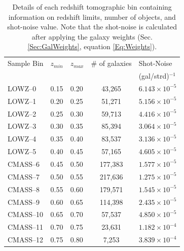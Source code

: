 \begin{table}
\centering
\caption[Tomographic redshift bins limits, number of galaxies, and shot-noise levels.]{Details of each redshift tomographic bin containing information on redshift limits, number of objects, and shot-noise value. Note that the shot-noise is calculated after applying the galaxy weights (Sec. \ref{Sec:GalWeights}, equation \eqref{Eq:Weights}).}
\label{Tb:Shells}
\begin{tabular}{lllcl}
\hline
\hline
Sample Bin & $z_{min}$ & $z_{max}$ & \# of galaxies & Shot-Noise \\ & & & & (gal/strd)$^{-1}$ \\
\hline 
\hline
LOWZ--0  & 0.15      & 0.20      &   43,265   & $6.143 \times 10^{-5} $\\
LOWZ--1  & 0.20      & 0.25      &   51,271   & $5.156 \times 10^{-5} $\\
LOWZ--2  & 0.25      & 0.30      &   59,713   & $4.416 \times 10^{-5} $\\
LOWZ--3  & 0.30      & 0.35      &   85,394   & $3.064 \times 10^{-5} $\\
LOWZ--4  & 0.35      & 0.40      &   83,537   &  $3.136\times 10^{-5} $\\
LOWZ--5  & 0.40      & 0.45      &   57,165   &  $4.605 \times 10^{-5} $\\
CMASS--6 & 0.45      & 0.50      &   177,383  &  $1.577\times 10^{-5} $\\
CMASS--7 & 0.50      & 0.55      &   217,636  &  $1.275\times 10^{-5}$ \\
CMASS--8 & 0.55      & 0.60      &   179,571  &  $1.545\times 10^{-5}$ \\
CMASS--9 & 0.60      & 0.65      &   114,398  &  $2.435 \times 10^{-5}$ \\
CMASS--10 & 0.65      & 0.70      &   57,537   &  $4.850 \times 10^{-5}$ \\
CMASS--11 & 0.70      & 0.75      &   23,631   &  $1.182 \times 10^{-4}$ \\
CMASS--12 & 0.75      & 0.80      &    7,253   &  $3.839 \times 10^{-4}$\\
\hline
\hline
\end{tabular}
\end{table}

